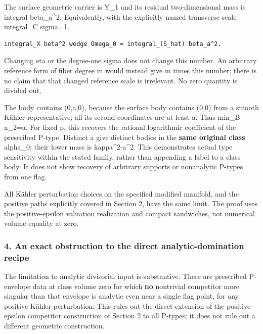\documentclass[11pt]{article}
\begin{document}
The surface geometric carrier is Y\_\allowbreak{}1 and its residual two-\allowbreak{}dimensional mass is integral beta\_\allowbreak{}a\textasciicircum{}\allowbreak{}2. Equivalently, with the explicitly named transverse scale integral\_\allowbreak{}C sigma=\allowbreak{}1,

\begin{Verbatim}[breaklines=true,fontsize=\small]
integral_X beta^2 wedge Omega_0 = integral_(S_hat) beta_a^2.
\end{Verbatim}

Changing eta or the degree-\allowbreak{}one sigma does not change this number. An arbitrary reference form of fiber degree m would instead give m times this number; there is no claim that that changed reference scale is irrelevant. No zero quantity is divided out.

The body contains (0,a,0), because the surface body contains (0,0) from a smooth Kähler representative; all its second coordinates are at least a. Thus min\_\allowbreak{}B x\_\allowbreak{}2=\allowbreak{}a. For fixed p, this recovers the rational logarithmic coefficient of the prescribed P-\allowbreak{}type. Distinct a give distinct bodies in the \textbf{same original class} alpha\_\allowbreak{}0; their lower mass is kappa\textasciicircum{}\allowbreak{}2-\allowbreak{}a\textasciicircum{}\allowbreak{}2. This demonstrates actual type sensitivity within the stated family, rather than appending a label to a class body. It does not show recovery of arbitrary supports or nonanalytic P-\allowbreak{}types from one flag.

All Kähler perturbation choices on the specified modified manifold, and the positive paths explicitly covered in Section 2, have the same limit. The proof uses the positive-\allowbreak{}epsilon valuation realization and compact sandwiches, not numerical volume equality at zero.

\subsubsection{4. An exact obstruction to the direct analytic-\allowbreak{}domination recipe}

The limitation to analytic divisorial input is substantive. There are prescribed P-\allowbreak{}envelope data at class volume zero for which \textbf{no} nontrivial competitor more singular than that envelope is analytic even near a single flag point, for any positive Kähler perturbation. This rules out the direct extension of the positive-\allowbreak{}epsilon competitor construction of Section 2 to all P-\allowbreak{}types; it does not rule out a different geometric construction.
\end{document}
